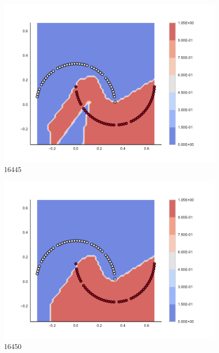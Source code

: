 \begin{subfigure}[b]{0.09\textwidth}
    \includegraphics[clip, trim=2.35cm 1.75cm 4.5cm 0cm,width=\textwidth]{img/convergence/16445.pdf}
    \caption{16445}
    \label{fig:convergence_16445}
\end{subfigure}
%
\begin{subfigure}[b]{0.09\textwidth}
    \includegraphics[clip, trim=2.35cm 1.75cm 4.5cm 0cm,width=\textwidth]{img/convergence/16450.pdf}
    \caption{16450}
    \label{fig:convergence_16450}
\end{subfigure}
%
